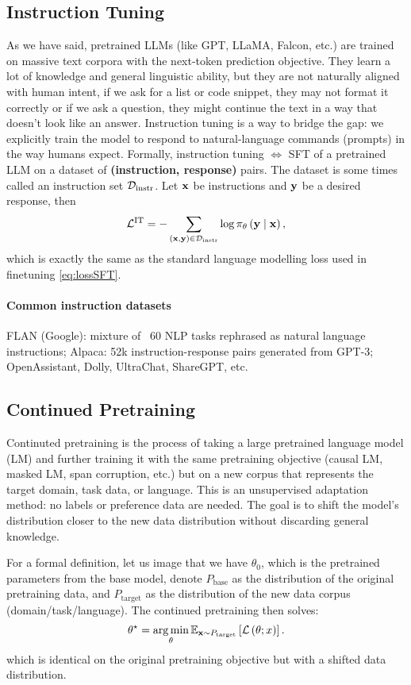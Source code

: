 \documentclass[11pt]{article}  %
\begin{document}
\subsection{Instruction Tuning}
As we have said, pretrained LLMs (like GPT, LLaMA, Falcon, etc.) are trained on massive text corpora with the next-token prediction objective.
They learn a lot of knowledge and general linguistic ability, but they are not naturally aligned with human intent, if we ask for a list or code snippet, they may not format it correctly or if we ask a question, they might continue the text in a way that doesn't look like an answer.
Instruction tuning is a way to bridge the gap: we explicitly train the model to respond to natural-language commands (prompts) in the way humans expect.
Formally, instruction tuning $\iff$ SFT of a pretrained LLM on a dataset of \textbf{(instruction, response)} pairs.
The dataset is some times called an instruction set $\mathcal{D}_{\text{instr}}$.
Let $\mathbf{x}$ be instructions and $\mathbf{y}$ be a desired response, then 
\begin{align*}
  \mathcal{L}^{\text{IT}} = - \sum_{(\mathbf{x}, \mathbf{y}) \in \mathcal{D}_{\text{instr}}} \log \pi_{\theta}\left( \mathbf{y} \mid \mathbf{x} \right),
\end{align*}
which is exactly the same as the standard language modelling loss used in finetuning \eqref{eq:lossSFT}.

\paragraph{Common instruction datasets} 
FLAN (Google): mixture of ~60 NLP tasks rephrased as natural language instructions; Alpaca: 52k instruction-response pairs generated from GPT-3;
OpenAssistant, Dolly, UltraChat, ShareGPT, etc.



\subsection{Continued Pretraining}
Continuted pretraining is the process of taking a large pretrained language model (LM) and further training it with the same pretraining objective (causal LM, masked LM, span corruption, etc.) but on a new corpus that represents the target domain, task data, or language.
This is an unsupervised adaptation method: no labels or preference data are needed.
The goal is to shift the model's distribution closer to the new data distribution without discarding general knowledge.

For a formal definition, let us image that we have $\theta_0$, which is the pretrained parameters from the base model, denote $P_{\text{base}}$ as the distribution of the original pretraining data, and $P_{\text{target}}$ as the distribution of the new data corpus (domain/task/language).
The continued pretraining then solves:
\begin{align*}
  \theta^\star = \operatorname*{arg\,min}_{\theta} \mathbb{E}_{\mathbf{x} \sim P_{\text{target}}}\left[\mathcal{L}\left( \theta; x \right)\right].
\end{align*}
which is identical on the original pretraining objective but with a shifted data distribution.
\end{document}
